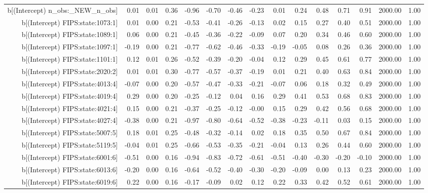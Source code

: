 \begin{table}[ht]
\begin{tabular}{rrrrrrrrrrrrrrr}
  b[(Intercept) n\_obs:\_NEW\_n\_obs] & 0.01 & 0.01 & 0.36 & -0.96 & -0.70 & -0.46 & -0.23 & 0.01 & 0.24 & 0.48 & 0.71 & 0.91 & 2000.00 & 1.00 \\ 
  b[(Intercept) FIPS:state:1073:1] & 0.01 & 0.00 & 0.21 & -0.53 & -0.41 & -0.26 & -0.13 & 0.02 & 0.15 & 0.27 & 0.40 & 0.51 & 2000.00 & 1.00 \\ 
  b[(Intercept) FIPS:state:1089:1] & 0.06 & 0.00 & 0.21 & -0.45 & -0.36 & -0.22 & -0.09 & 0.07 & 0.20 & 0.34 & 0.46 & 0.60 & 2000.00 & 1.00 \\ 
  b[(Intercept) FIPS:state:1097:1] & -0.19 & 0.00 & 0.21 & -0.77 & -0.62 & -0.46 & -0.33 & -0.19 & -0.05 & 0.08 & 0.26 & 0.36 & 2000.00 & 1.00 \\ 
  b[(Intercept) FIPS:state:1101:1] & 0.12 & 0.01 & 0.26 & -0.52 & -0.39 & -0.20 & -0.04 & 0.12 & 0.29 & 0.45 & 0.61 & 0.77 & 2000.00 & 1.00 \\ 
  b[(Intercept) FIPS:state:2020:2] & 0.01 & 0.01 & 0.30 & -0.77 & -0.57 & -0.37 & -0.19 & 0.01 & 0.21 & 0.40 & 0.63 & 0.84 & 2000.00 & 1.00 \\ 
  b[(Intercept) FIPS:state:4013:4] & -0.07 & 0.00 & 0.20 & -0.57 & -0.47 & -0.33 & -0.21 & -0.07 & 0.06 & 0.18 & 0.32 & 0.49 & 2000.00 & 1.00 \\ 
  b[(Intercept) FIPS:state:4019:4] & 0.29 & 0.00 & 0.20 & -0.25 & -0.12 & 0.04 & 0.16 & 0.29 & 0.41 & 0.53 & 0.68 & 0.83 & 2000.00 & 1.00 \\ 
  b[(Intercept) FIPS:state:4021:4] & 0.15 & 0.00 & 0.21 & -0.37 & -0.25 & -0.12 & -0.00 & 0.15 & 0.29 & 0.42 & 0.56 & 0.68 & 2000.00 & 1.00 \\ 
  b[(Intercept) FIPS:state:4027:4] & -0.38 & 0.00 & 0.21 & -0.97 & -0.80 & -0.64 & -0.52 & -0.38 & -0.23 & -0.11 & 0.03 & 0.15 & 2000.00 & 1.00 \\ 
  b[(Intercept) FIPS:state:5007:5] & 0.18 & 0.01 & 0.25 & -0.48 & -0.32 & -0.14 & 0.02 & 0.18 & 0.35 & 0.50 & 0.67 & 0.84 & 2000.00 & 1.00 \\ 
  b[(Intercept) FIPS:state:5119:5] & -0.04 & 0.01 & 0.25 & -0.66 & -0.53 & -0.35 & -0.21 & -0.04 & 0.13 & 0.26 & 0.44 & 0.60 & 2000.00 & 1.00 \\ 
  b[(Intercept) FIPS:state:6001:6] & -0.51 & 0.00 & 0.16 & -0.94 & -0.83 & -0.72 & -0.61 & -0.51 & -0.40 & -0.30 & -0.20 & -0.10 & 2000.00 & 1.00 \\ 
  b[(Intercept) FIPS:state:6013:6] & -0.20 & 0.00 & 0.16 & -0.64 & -0.52 & -0.40 & -0.30 & -0.20 & -0.09 & 0.00 & 0.13 & 0.23 & 2000.00 & 1.00 \\ 
  b[(Intercept) FIPS:state:6019:6] & 0.22 & 0.00 & 0.16 & -0.17 & -0.09 & 0.02 & 0.12 & 0.22 & 0.33 & 0.42 & 0.52 & 0.61 & 2000.00 & 1.00 \\ 

\end{tabular}
\end{table}
